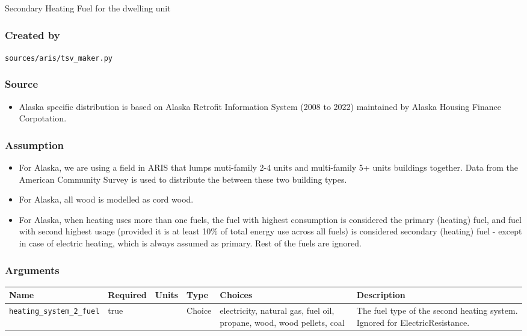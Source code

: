 Secondary Heating Fuel for the dwelling unit

\subsubsection{Created by}\label{created-by-75}

\texttt{sources/aris/tsv\_maker.py}

\subsubsection{Source}\label{source-74}

\begin{itemize}
 
\item
  Alaska specific distribution is based on Alaska Retrofit Information
  System (2008 to 2022) maintained by Alaska Housing Finance
  Corpotation.
\end{itemize}

\subsubsection{Assumption}\label{assumption-45}

\begin{itemize}
 
\item
  For Alaska, we are using a field in ARIS that lumps muti-family 2-4
  units and multi-family 5+ units buildings together. Data from the
  American Community Survey is used to distribute the between these two
  building types.
\item
  For Alaska, all wood is modelled as cord wood.
\item
  For Alaska, when heating uses more than one fuels, the fuel with
  highest consumption is considered the primary (heating) fuel, and fuel
  with second highest usage (provided it is at least 10\% of total
  energy use across all fuels) is considered secondary (heating) fuel -
  except in case of electric heating, which is always assumed as
  primary. Rest of the fuels are ignored.
\end{itemize}

\subsubsection{Arguments}\label{arguments-47}

\begin{longtable}[]{@{}llllll@{}}
\toprule\noalign{}
Name & Required & Units & Type & Choices & Description \\
\midrule\noalign{}
\endhead
\bottomrule\noalign{}
\endlastfoot
\texttt{heating\_system\_2\_fuel} & true & & Choice & electricity,
natural gas, fuel oil, propane, wood, wood pellets, coal & The fuel type
of the second heating system. Ignored for ElectricResistance. \\
\end{longtable}

